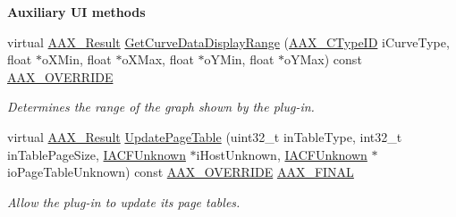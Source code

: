 \begin{Indent}{\bf Auxiliary U\+I methods}
\begin{DoxyCompactItemize}
virtual \hyperlink{a00149_a4d8f69a697df7f70c3a8e9b8ee130d2f}{A\+A\+X\+\_\+\+Result} \hyperlink{a00018_aaa02d76800a2a0dad30587e13c89da7d}{Get\+Curve\+Data\+Display\+Range} (\hyperlink{a00149_ac678f9c1fbcc26315d209f71a147a175}{A\+A\+X\+\_\+\+C\+Type\+I\+D} i\+Curve\+Type, float $\ast$o\+X\+Min, float $\ast$o\+X\+Max, float $\ast$o\+Y\+Min, float $\ast$o\+Y\+Max) const \hyperlink{a00149_ac2f24a5172689ae684344abdcce55463}{A\+A\+X\+\_\+\+O\+V\+E\+R\+R\+I\+D\+E}
\begin{DoxyCompactList}\small\item\em Determines the range of the graph shown by the plug-\/in. \end{DoxyCompactList}\item 
virtual \hyperlink{a00149_a4d8f69a697df7f70c3a8e9b8ee130d2f}{A\+A\+X\+\_\+\+Result} \hyperlink{a00018_ab3ae4c63bed249f30ee21df29d0cba6d}{Update\+Page\+Table} (uint32\+\_\+t in\+Table\+Type, int32\+\_\+t in\+Table\+Page\+Size, \hyperlink{a00146}{I\+A\+C\+F\+Unknown} $\ast$i\+Host\+Unknown, \hyperlink{a00146}{I\+A\+C\+F\+Unknown} $\ast$io\+Page\+Table\+Unknown) const \hyperlink{a00149_ac2f24a5172689ae684344abdcce55463}{A\+A\+X\+\_\+\+O\+V\+E\+R\+R\+I\+D\+E} \hyperlink{a00149_aa4da4a09e940c332a2205e34e0677f40}{A\+A\+X\+\_\+\+F\+I\+N\+A\+L}
\begin{DoxyCompactList}\small\item\em Allow the plug-\/in to update its page tables. \end{DoxyCompactList}\end{DoxyCompactItemize}
\end{Indent}

